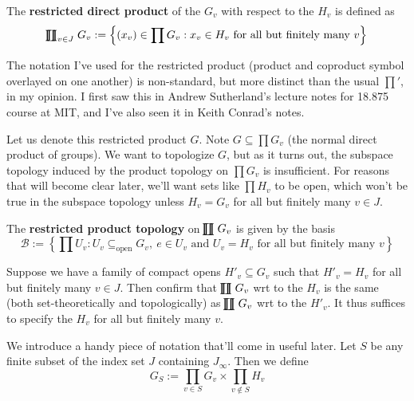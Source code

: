 \documentclass[11pt, x11names]{book}
\newcommand{\calb}{\mathcal{B}}
\newcommand{\set}[1]{\left\{ #1 \right\}}
\newcommand{\rprod}{
    \mathrel{\ooalign{\hidewidth $\prod$ \hidewidth \cr $\coprod$}}
}
\begin{document}
\begin{defn}
The \textbf{restricted direct product} of the $G_v$ with respect to the $H_v$ is defined as 
\begin{equation*}
    \rprod_{v \in J} G_v := \set{(x_v) \in \prod G_v : x_v \in H_v \text{ for all but finitely many } v}
\end{equation*}
\end{defn}

\begin{remark}
The notation I've used for the restricted product (product and coproduct symbol overlayed on one another) is non-standard, but more distinct than the usual $\prod'$, in my opinion. I first saw this in Andrew Sutherland's lecture notes for 18.875 course at MIT, and I've also seen it in Keith Conrad's notes.
\end{remark}

Let us denote this restricted product $G$. Note $G \subseteq \prod G_v$ (the normal
direct product of groups). We want to topologize $G$, but as it turns out, the subspace topology induced by the product topology on $\prod G_v$ is insufficient. For reasons that will become clear later, we'll want sets like $\prod H_v$ to be open, which won't be true in the subspace topology unless $H_v = G_v$ for all but finitely many $v \in J$.

\begin{defn}
    The \textbf{restricted product topology} on $\rprod G_v$ is given by the basis
    \begin{equation*}
        \calb := \set{\prod U_v : U_v \subseteq_{\text{open}} G_v, \ e \in U_v \text{ and } U_v = H_v \text{ for all but finitely many } v}
    \end{equation*}
\end{defn}

\begin{sanitycheck}
Suppose we have a family of compact opens $H'_v \subseteq G_v$ such that $H'_v = H_v$ for all but finitely many $v \in J$. Then confirm that $\rprod G_v$ wrt to the $H_v$ is the same (both set-theoretically and topologically) as $\rprod G_v$ wrt to the $H'_v$. It thus suffices to specify the $H_v$ for all but finitely many $v$.
\end{sanitycheck}

We introduce a handy piece of notation that'll come in useful later. Let $S$ be any finite subset of the index set $J$ containing $J_\infty$. Then we define
\begin{equation*}
    G_S := \prod_{v \in S} G_v \times \prod_{v \notin S} H_v
\end{equation*}
\end{document}

